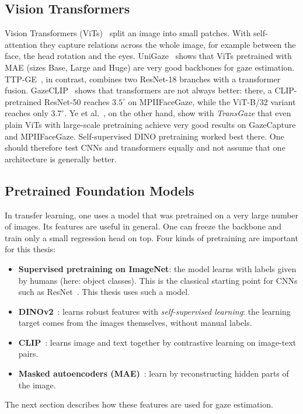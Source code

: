 \subsection{Vision Transformers}
\label{subsec:vit}
Vision Transformers (ViTs)~\cite{dosovitskiy2021vit} split an image into small
patches. With self-attention they capture relations across the whole image,
for example between the face, the head rotation and the eyes.
UniGaze~\cite{qin2026unigaze} shows that ViTs pretrained with MAE (sizes Base,
Large and Huge) are very good backbones for gaze estimation.
TTP-GE~\cite{nagpure2025ttpge}, in contrast, combines two ResNet-18 branches
with a transformer fusion. GazeCLIP~\cite{wang2026gazeclip} shows that
transformers are not always better: there, a CLIP-pretrained ResNet-50 reaches
$3.5^\circ$ on MPIIFaceGaze, while the ViT-B/32 variant reaches only
$3.7^\circ$. Ye et al.~\cite{ye2024transgaze}, on the other hand, show with
\emph{TransGaze} that even plain ViTs with large-scale pretraining achieve very
good results on GazeCapture and MPIIFaceGaze. Self-supervised DINO pretraining
worked best there. One should therefore test CNNs and transformers equally and
not assume that one architecture is generally better.

\subsection{Pretrained Foundation Models}
\label{subsec:foundation}
In transfer learning, one uses a model that was pretrained on a very large
number of images. Its features are useful in general. One can freeze the
backbone and train only a small regression head on top. Four kinds of
pretraining are important for this thesis:
\begin{itemize}
  \item \textbf{Supervised pretraining on ImageNet}: the model learns with
        labels given by humans (here: object classes). This is the classical
        starting point for CNNs such as ResNet~\cite{he2016resnet}. This
        thesis uses such a model.
  \item \textbf{DINOv2}~\cite{oquab2023dinov2}: learns robust features with
        \emph{self-supervised learning}: the learning target comes from the
        images themselves, without manual labels.
  \item \textbf{CLIP}~\cite{radford2021clip}: learns image and text together
        by contrastive learning on image-text pairs.
  \item \textbf{Masked autoencoders (MAE)}~\cite{he2022mae}: learn by
        reconstructing hidden parts of the image.
\end{itemize}
The next section describes how these features are used for gaze estimation.

